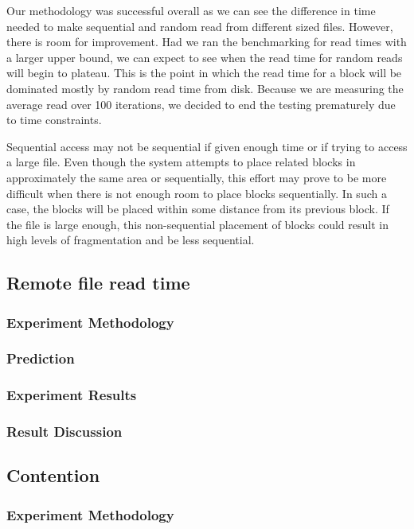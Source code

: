 \documentclass{article} %
\begin{document}
Our methodology was successful overall as we can see the difference in time needed to make sequential and random read from different sized files. However, there is room for improvement. Had we ran the benchmarking for read times with a larger upper bound, we can expect to see when the read time for random reads will begin to plateau. This is the point in which the read time for a block will be dominated mostly by random read time from disk. Because we are measuring the average read over 100 iterations, we decided to end the testing prematurely due to time constraints. 

Sequential access may not be sequential if given enough time or if trying to access a large file. Even though the system attempts to place related blocks in approximately the same area or sequentially, this effort may prove to be more difficult when there is not enough room to place blocks sequentially. In such a case, the blocks will be placed within some distance from its previous block. If the file is large enough, this non-sequential placement of blocks could result in high levels of fragmentation and be less sequential.

\subsection{Remote file read time}

\subsubsection{Experiment Methodology}
\subsubsection{Prediction}
\subsubsection{Experiment Results}
\subsubsection{Result Discussion}

\subsection{Contention}

\subsubsection{Experiment Methodology}
\end{document}
